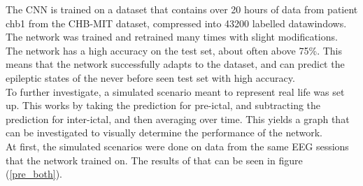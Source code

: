 


The CNN is trained on a dataset that contains over 20 hours of data from patient chb1 from the CHB-MIT dataset, compressed into 43200 labelled datawindows. The network was trained and retrained many times with slight modifications. \\

The network has a high accuracy on the test set, about often above 75\%. This means that the network successfully adapts to the dataset, and can predict the epileptic states of the never before seen test set with high accuracy. \\

To further investigate, a simulated scenario meant to represent real life was set up. This works by taking the prediction for pre-ictal, and subtracting the prediction for inter-ictal, and then averaging over time. This yields a graph that can be investigated to visually determine the performance of the network. \\

At first, the simulated scenarios were done on data from the same EEG sessions that the network trained on. The results of that can be seen in figure (\ref{pre_both}).

